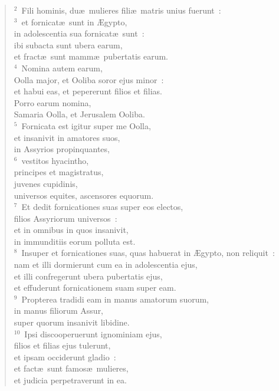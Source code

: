 \begin{flushleft}\begin{verse}\vspace{6pt}${}^{2}$~Fili hominis, du\ae\ mulieres fili\ae\ matris unius fuerunt~:\\
${}^{3}$~et fornicat\ae\ sunt in \AE gypto,\\ in adolescentia sua fornicat\ae\ sunt~:\\ ibi subacta sunt ubera earum,\\ et fract\ae\ sunt mamm\ae\ pubertatis earum.\\
${}^{4}$~Nomina autem earum,\\ Oolla major, et Ooliba soror ejus minor~:\\ et habui eas, et pepererunt filios et filias.\\ Porro earum nomina,\\ Samaria Oolla, et Jerusalem Ooliba.\\
${}^{5}$~Fornicata est igitur super me Oolla,\\ et insanivit in amatores suos,\\ in Assyrios propinquantes,\\
${}^{6}$~vestitos hyacintho,\\ principes et magistratus,\\ juvenes cupidinis,\\ universos equites, ascensores equorum.\\
${}^{7}$~Et dedit fornicationes suas super eos electos,\\ filios Assyriorum universos~:\\ et in omnibus in quos insanivit,\\ in immunditiis eorum polluta est.\\
${}^{8}$~Insuper et fornicationes suas, quas habuerat in \AE gypto, non reliquit~:\\ nam et illi dormierunt cum ea in adolescentia ejus,\\ et illi confregerunt ubera pubertatis ejus,\\ et effuderunt fornicationem suam super eam.\\
${}^{9}$~Propterea tradidi eam in manus amatorum suorum,\\ in manus filiorum Assur,\\ super quorum insanivit libidine.\\
${}^{10}$~Ipsi discooperuerunt ignominiam ejus,\\ filios et filias ejus tulerunt,\\ et ipsam occiderunt gladio~:\\ et fact\ae\ sunt famos\ae\ mulieres,\\ et judicia perpetraverunt in ea.\\

\end{verse}
\end{flushleft}
